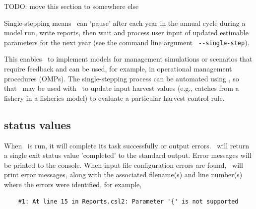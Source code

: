 TODO: move this section to somewhere else

Single-stepping means \CNAME\ can 'pause' after each year in the annual cycle during a model run, write reports, then wait and process user input of updated estimable parameters for the next year (see the command line argument \texttt{ -{}-single-step}).

This enables \CNAME\ to implement models for management simulations or scenarios that require feedback and can be used, for example, in operational management procedures (OMPs). The single-stepping process can be automated using \R, so that \CNAME\ may be used with \R\ to update input harvest values (e.g., catches from a fishery in a fisheries model) to evaluate a particular harvest control rule.

\subsection{\CNAME\exit status values}

When \CNAME\ is run, it will complete its task successfully or output errors. \CNAME\ will return a single exit status value 'completed' to the standard output. Error messages will be printed to the console. When input file configuration errors are found, \CNAME\ will print error messages, along with the associated filename(s) and line number(s) where the errors were identified, for example,

{\small{\begin{verbatim}
	#1: At line 15 in Reports.csl2: Parameter '{' is not supported
\end{verbatim}}}
